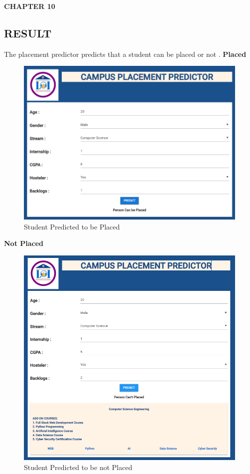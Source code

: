 \documentclass[12pt]{article}
\begin{document}
\newpage
\begin{flushleft}\textbf{CHAPTER 10} \end{flushleft}
\begin{flushleft}\section{RESULT} \end{flushleft}
The placement predictor predicts that a student can be placed or not .
\textbf{Placed}
\begin{figure}[H]
\begin{center}
\includegraphics[scale=.4]{Result}
\caption{Student Predicted to be Placed}
\end{center}
\end{figure}
\textbf{Not Placed}
\begin{figure}[H]
\begin{center}
\includegraphics[scale=.4]{Result0}
\caption{Student Predicted to be not Placed}
\end{center}
\end{figure}
\end{document}
